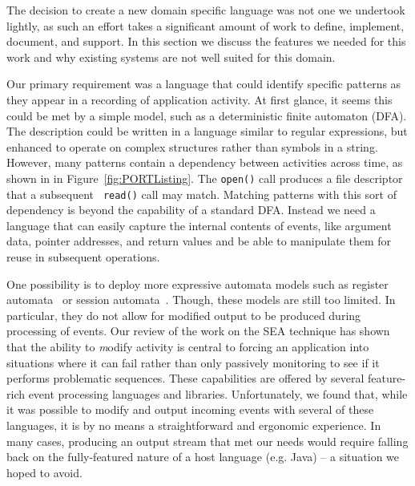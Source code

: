 The decision to create a new domain specific language was not one we
undertook lightly,
as such an effort takes
a significant amount of work
to define,
implement, document, and support.
In this section we discuss the features we needed for this work
and why existing systems are not well suited for this domain.

Our primary requirement was a language that could identify specific
patterns as they appear in a recording of application activity.
At first glance, it seems this could be met by a simple model,
such as a deterministic finite automaton (DFA).
The description could be written
in a language similar to
regular expressions, but enhanced to operate on complex
structures rather than symbols in a string.
However, many patterns contain a dependency
between activities
across time,
as shown in
in Figure~\ref{fig:PORTListing}.
The {\tt open()} call produces a file descriptor that a subsequent {\tt
read()} call may match.
Matching patterns with this sort of dependency is beyond the capability
of a standard DFA.
Instead we need a language
that can easily capture
the internal contents of events,
like argument data,
pointer addresses,
and return values
and be able to
manipulate them for
reuse in subsequent operations.

One possibility is to deploy more expressive automata models such as register automata~\cite{DBLP:journals/tcs/KaminskiF94} or session automata~\cite{DBLP:journals/corr/BolligHLM14}. Though, these models are still too limited.
In particular, they do not allow for modified output to be
produced during processing of events.
Our review of the work on the SEA technique has shown that the ability to
{\textit modify} activity is central to forcing
an application into situations where
it can fail rather than only passively monitoring to see if it performs
problematic sequences.
These capabilities are offered by several feature-rich event processing
languages and libraries.
Unfortunately, we found that, while it was possible to modify and output
incoming events with several of these languages,
it is by no means a straightforward
and ergonomic experience.
In many cases, producing an output stream that met
our needs would require
falling back on the fully-featured nature of a host language (e.g. Java) -- a situation
we hoped to avoid.

